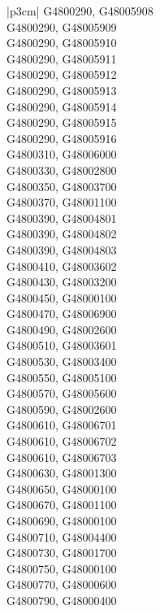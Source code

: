 \begin{customLongTable}{ |p{3cm}| }
G4800290, G48005908 \\ \hline
G4800290, G48005909 \\ \hline
G4800290, G48005910 \\ \hline
G4800290, G48005911 \\ \hline
G4800290, G48005912 \\ \hline
G4800290, G48005913 \\ \hline
G4800290, G48005914 \\ \hline
G4800290, G48005915 \\ \hline
G4800290, G48005916 \\ \hline
G4800310, G48006000 \\ \hline
G4800330, G48002800 \\ \hline
G4800350, G48003700 \\ \hline
G4800370, G48001100 \\ \hline
G4800390, G48004801 \\ \hline
G4800390, G48004802 \\ \hline
G4800390, G48004803 \\ \hline
G4800410, G48003602 \\ \hline
G4800430, G48003200 \\ \hline
G4800450, G48000100 \\ \hline
G4800470, G48006900 \\ \hline
G4800490, G48002600 \\ \hline
G4800510, G48003601 \\ \hline
G4800530, G48003400 \\ \hline
G4800550, G48005100 \\ \hline
G4800570, G48005600 \\ \hline
G4800590, G48002600 \\ \hline
G4800610, G48006701 \\ \hline
G4800610, G48006702 \\ \hline
G4800610, G48006703 \\ \hline
G4800630, G48001300 \\ \hline
G4800650, G48000100 \\ \hline
G4800670, G48001100 \\ \hline
G4800690, G48000100 \\ \hline
G4800710, G48004400 \\ \hline
G4800730, G48001700 \\ \hline
G4800750, G48000100 \\ \hline
G4800770, G48000600 \\ \hline
G4800790, G48000400 \\ \hline

\end{customLongTable}
